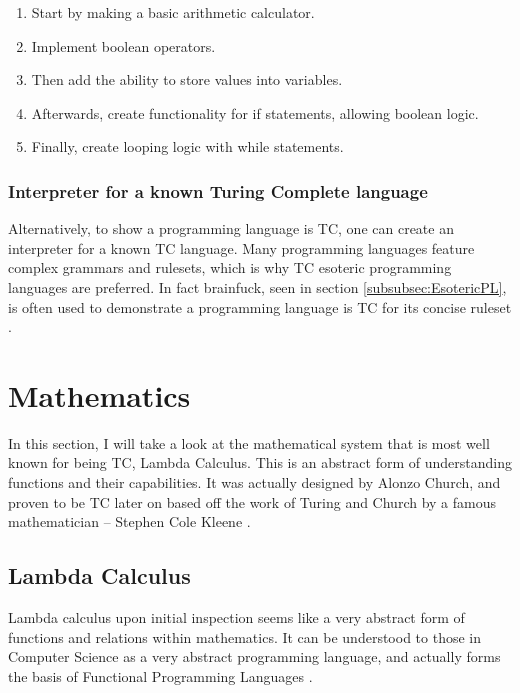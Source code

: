 \begin{enumerate}
    \item Start by making a basic arithmetic calculator.
    \item Implement boolean operators.
    \item Then add the ability to store values into variables.
    \item Afterwards, create functionality for if statements, allowing boolean logic.
    \item Finally, create looping logic with while statements.
\end{enumerate}

\subsubsection{Interpreter for a known Turing Complete language}\label{subsec:InterpreterTC}

Alternatively, to show a programming language is TC, one can create an interpreter for a known TC language.
Many programming languages feature complex grammars and rulesets, which is why TC esoteric programming languages are preferred.
In fact brainfuck, seen in section \ref{subsubsec:EsotericPL}, is often used to demonstrate a programming language is TC for its concise ruleset \cite{CBfInter,MeepWebsite,MeepGH,PythonBfInt}.

\section{Mathematics}\label{sec:Maths}

In this section, I will take a look at the mathematical system that is most well known for being TC, Lambda Calculus.
This is an abstract form of understanding functions and their capabilities.
It was actually designed by Alonzo Church, and proven to be TC later on based off the work of Turing and Church by a famous mathematician -- Stephen Cole Kleene \cite{LambdaCalcKleene}.

\subsection{Lambda Calculus}\label{subsec:LambdaCalc}

Lambda calculus upon initial inspection seems like a very abstract form of functions and relations within mathematics.
It can be understood to those in Computer Science as a very abstract programming language, and actually forms the basis of Functional Programming Languages \cite{TutLambdaCalc,FuncProgrChap}.

